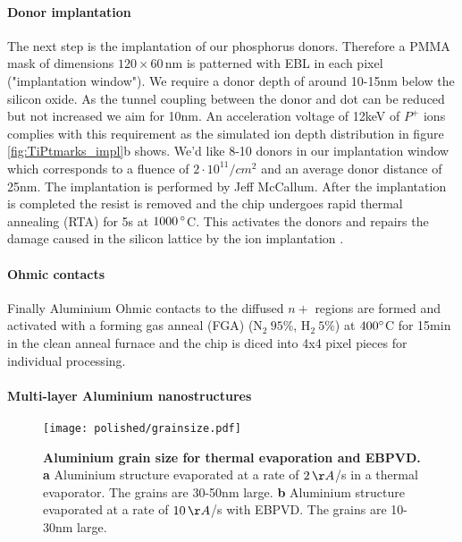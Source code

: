 \paragraph*{Donor implantation}
The next step is the implantation of our phosphorus donors. Therefore a PMMA mask of dimensions  $120\times60\,$nm is patterned with EBL in each pixel ("implantation window"). We require a donor depth of around 10-15nm below the silicon oxide. As the tunnel coupling between the donor and dot can be reduced but not increased we aim for 10nm. An acceleration voltage of 12keV of $P^+$ ions complies with this requirement as the simulated ion depth distribution in figure \ref{fig:TiPtmarks_impl}b shows. We'd like 8-10 donors in our implantation window which corresponds to a fluence of $2\cdot 10^{11}/cm^2$ and an average donor distance of 25nm. The implantation is performed by Jeff McCallum. After the implantation is completed the resist is removed and the chip undergoes rapid thermal annealing (RTA) for 5s at $1000\,\degree$C. This activates the donors and repairs the damage caused in the silicon lattice by the ion implantation \cite{McCamey2005}. 

\paragraph*{Ohmic contacts}
Finally Aluminium Ohmic contacts to the diffused $n+$ regions are formed and activated with a forming gas anneal (FGA) (N$_2\ 95\%$, H$_2\ 5\%$) at $400\degree$C for 15min in the clean anneal furnace and the chip is diced into 4x4 pixel pieces for individual processing. 

\paragraph*{Multi-layer Aluminium nanostructures}

\begin{figure}
	\centering
	\texttt{[image: polished/grainsize.pdf]}
	\caption[Aluminium grain size for thermal evaporation and EBPVD]{\textbf{Aluminium grain size for thermal evaporation and EBPVD. a} Aluminium structure evaporated at a rate of $2\,\AA$/s in a thermal evaporator. The grains are 30-50nm large. \textbf{b} Aluminium structure evaporated at a rate of $10\,\AA$/s with EBPVD. The grains are 10-30nm large. }
	\label{fig:grainsize}
\end{figure}

